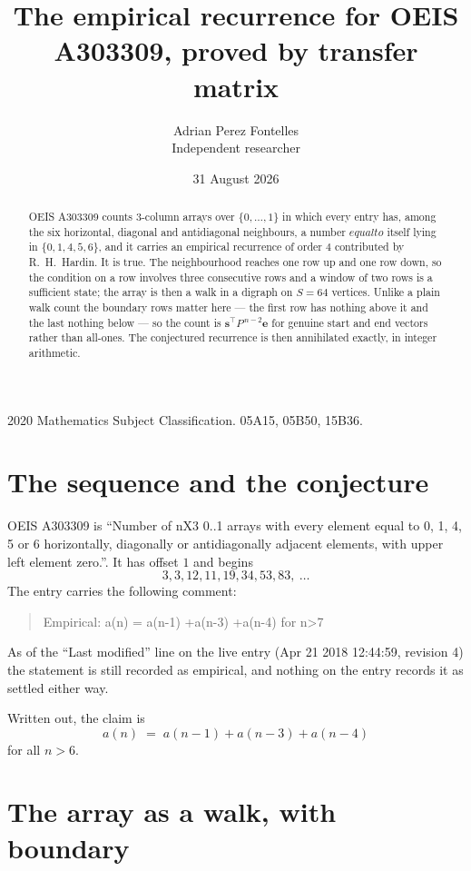 \documentclass[11pt,a4paper]{article}
\title{The empirical recurrence for OEIS A303309, proved by transfer matrix}
\author{Adrian Perez Fontelles\\ \small Independent researcher}
\date{31 August 2026}
\theoremstyle{plain}
\theoremstyle{definition}
\begin{document}
\maketitle

\begin{abstract}
OEIS A303309 counts $3$-column arrays over $\{0,\dots,1\}$ in which every entry has,
among the six horizontal, diagonal and antidiagonal neighbours, a number $equal to$ itself lying in $\{0,1,4,5,6\}$, and it carries an empirical
recurrence of order $4$ contributed by R.~H.~Hardin. It is true. The neighbourhood
reaches one row up and one row down, so the condition on a row involves three consecutive
rows and a window of two rows is a sufficient state; the array is then a walk in a digraph
on $S=64$ vertices. Unlike a plain walk count the boundary rows matter here --- the first
row has nothing above it and the last nothing below --- so the count is
$\mathbf{s}^{\!\top}P^{\,n-2}\mathbf{e}$ for genuine start and end vectors rather than
all-ones. The conjectured recurrence is then annihilated exactly, in integer arithmetic.
\end{abstract}

\noindent\small 2020 Mathematics Subject Classification. 05A15, 05B50, 15B36.\normalsize

\section{The sequence and the conjecture}

OEIS A303309 is ``Number of nX3 0..1 arrays with every element equal to 0, 1, 4, 5 or 6 horizontally, diagonally or antidiagonally adjacent elements, with upper left element zero.''. It has offset
$1$ and begins
\[
3, 3, 12, 11, 19, 34, 53, 83,\ \dots
\]
The entry carries the following comment:
\begin{quote}\small
Empirical: a(n) = a(n-1) +a(n-3) +a(n-4) for n>7
\end{quote}
As of the ``Last modified'' line on the live entry (Apr 21 2018 12:44:59, revision
4) the statement is still recorded as empirical, and nothing on the entry
records it as settled either way.

Written out, the claim is
\begin{equation}\label{eq:conj}
a(n)\;=\;a(n-1) + a(n-3) + a(n-4)
\end{equation}
for all $n>6$.

\section{The array as a walk, with boundary}
\end{document}
